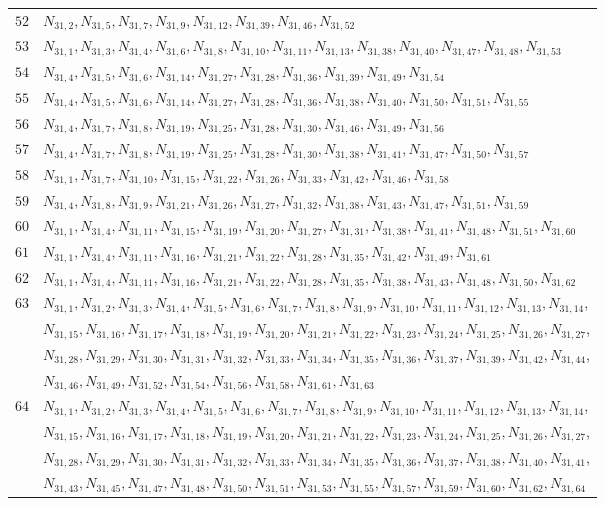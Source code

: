 \documentclass{amsart}
\theoremstyle{plain}
\theoremstyle{definition}
\theoremstyle{remark}
\begin{document}
{\begin{longtable}{ll}
$52$ & $N_{31,2}, N_{31,5}, N_{31,7}, N_{31,9}, N_{31,12}, N_{31,39}, N_{31,46}, N_{31,52}$\\
$53$ & $N_{31,1}, N_{31,3}, N_{31,4}, N_{31,6}, N_{31,8}, N_{31,10}, N_{31,11}, N_{31,13}, N_{31,38}, N_{31,40}, N_{31,47}, N_{31,48}, N_{31,53}$\\
$54$ & $N_{31,4}, N_{31,5}, N_{31,6}, N_{31,14}, N_{31,27}, N_{31,28}, N_{31,36}, N_{31,39}, N_{31,49}, N_{31,54}$\\
$55$ & $N_{31,4}, N_{31,5}, N_{31,6}, N_{31,14}, N_{31,27}, N_{31,28}, N_{31,36}, N_{31,38}, N_{31,40}, N_{31,50}, N_{31,51}, N_{31,55}$\\
$56$ & $N_{31,4}, N_{31,7}, N_{31,8}, N_{31,19}, N_{31,25}, N_{31,28}, N_{31,30}, N_{31,46}, N_{31,49}, N_{31,56}$\\
$57$ & $N_{31,4}, N_{31,7}, N_{31,8}, N_{31,19}, N_{31,25}, N_{31,28}, N_{31,30}, N_{31,38}, N_{31,41}, N_{31,47}, N_{31,50}, N_{31,57}$\\
$58$ & $N_{31,1}, N_{31,7}, N_{31,10}, N_{31,15}, N_{31,22}, N_{31,26}, N_{31,33}, N_{31,42}, N_{31,46}, N_{31,58}$\\
$59$ & $N_{31,4}, N_{31,8}, N_{31,9}, N_{31,21}, N_{31,26}, N_{31,27}, N_{31,32}, N_{31,38}, N_{31,43}, N_{31,47}, N_{31,51}, N_{31,59}$\\
$60$ & $N_{31,1}, N_{31,4}, N_{31,11}, N_{31,15}, N_{31,19}, N_{31,20}, N_{31,27}, N_{31,31}, N_{31,38}, N_{31,41}, N_{31,48}, N_{31,51}, N_{31,60}$\\
$61$ & $N_{31,1}, N_{31,4}, N_{31,11}, N_{31,16}, N_{31,21}, N_{31,22}, N_{31,28}, N_{31,35}, N_{31,42}, N_{31,49}, N_{31,61}$\\
$62$ & $N_{31,1}, N_{31,4}, N_{31,11}, N_{31,16}, N_{31,21}, N_{31,22}, N_{31,28}, N_{31,35}, N_{31,38}, N_{31,43}, N_{31,48}, N_{31,50}, N_{31,62}$\\
$63$ & $N_{31,1}, N_{31,2}, N_{31,3}, N_{31,4}, N_{31,5}, N_{31,6}, N_{31,7}, N_{31,8}, N_{31,9}, N_{31,10}, N_{31,11}, N_{31,12}, N_{31,13}, N_{31,14}$,\\
 & $N_{31,15}, N_{31,16}, N_{31,17}, N_{31,18}, N_{31,19}, N_{31,20}, N_{31,21}, N_{31,22}, N_{31,23}, N_{31,24}, N_{31,25}, N_{31,26}, N_{31,27}$,\\
 & $N_{31,28}, N_{31,29}, N_{31,30}, N_{31,31}, N_{31,32}, N_{31,33}, N_{31,34}, N_{31,35}, N_{31,36}, N_{31,37}, N_{31,39}, N_{31,42}, N_{31,44}$,\\ 
 & $N_{31,46}, N_{31,49}, N_{31,52}, N_{31,54}, N_{31,56}, N_{31,58}, N_{31,61}, N_{31,63}$\\
$64$ & $N_{31,1}, N_{31,2}, N_{31,3}, N_{31,4}, N_{31,5}, N_{31,6}, N_{31,7}, N_{31,8}, N_{31,9}, N_{31,10}, N_{31,11}, N_{31,12}, N_{31,13}, N_{31,14}$,\\ 
 & $N_{31,15}, N_{31,16}, N_{31,17}, N_{31,18}, N_{31,19}, N_{31,20}, N_{31,21}, N_{31,22}, N_{31,23}, N_{31,24}, N_{31,25}, N_{31,26}, N_{31,27}$,\\ 
 & $N_{31,28}, N_{31,29}, N_{31,30}, N_{31,31}, N_{31,32}, N_{31,33}, N_{31,34}, N_{31,35}, N_{31,36}, N_{31,37}, N_{31,38}, N_{31,40}, N_{31,41}$,\\ 
& $N_{31,43}, N_{31,45}, N_{31,47}, N_{31,48}, N_{31,50}, N_{31,51}, N_{31,53}, N_{31,55}, N_{31,57}, N_{31,59}, N_{31,60}, N_{31,62}, N_{31,64}$
\end{longtable}
}
\end{document}
